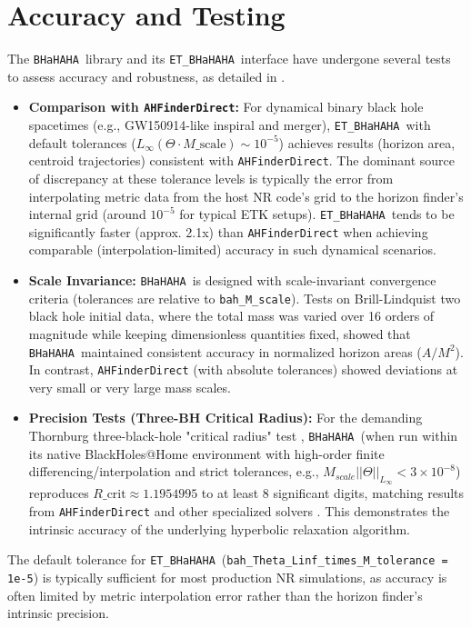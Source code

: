 \documentclass[a4paper,11pt]{article}
\newcommand{\thorn}[1]{{\tt #1}}
\newcommand{\BHaHAHA}{\thorn{ET\_BHaHAHA}} %
\newcommand{\bhahlib}{\texttt{BHaHAHA}} %
\begin{document}
\section{Accuracy and Testing}
\label{sec:accuracy}
The \bhahlib\ library and its \BHaHAHA\ interface have undergone several tests to assess accuracy and robustness, as detailed in \cite{Etienne2025etal}.
\begin{itemize}
    \item \textbf{Comparison with \thorn{AHFinderDirect}:} For dynamical binary black hole spacetimes (e.g., GW150914-like inspiral and merger), \BHaHAHA\ with default tolerances ($L_\infty(\Theta \cdot M\_{\text{scale}}) \sim 10^{-5}$) achieves results (horizon area, centroid trajectories) consistent with \thorn{AHFinderDirect}. The dominant source of discrepancy at these tolerance levels is typically the error from interpolating metric data from the host NR code's grid to the horizon finder's internal grid (around $10^{-5}$ for typical ETK setups). \BHaHAHA\ tends to be significantly faster (approx. 2.1x) than \thorn{AHFinderDirect} when achieving comparable (interpolation-limited) accuracy in such dynamical scenarios.
    \item \textbf{Scale Invariance:} \bhahlib\ is designed with scale-invariant convergence criteria (tolerances are relative to \texttt{bah\_M\_scale}). Tests on Brill-Lindquist two black hole initial data, where the total mass was varied over 16 orders of magnitude while keeping dimensionless quantities fixed, showed that \bhahlib\ maintained consistent accuracy in normalized horizon areas ($A/M^2$). In contrast, \thorn{AHFinderDirect} (with absolute tolerances) showed deviations at very small or very large mass scales.
    \item \textbf{Precision Tests (Three-BH Critical Radius):} For the demanding Thornburg three-black-hole "critical radius" test \cite{Thornburg04AHF}, \bhahlib\ (when run within its native BlackHoles@Home environment with high-order finite differencing/interpolation and strict tolerances, e.g., $M_{scale}||\Theta||_{L_\infty} < 3 \times 10^{-8}$) reproduces $R\_{\text{crit}} \approx 1.1954995$ to at least 8 significant digits, matching results from \thorn{AHFinderDirect} and other specialized solvers \cite{HuiLin2025}. This demonstrates the intrinsic accuracy of the underlying hyperbolic relaxation algorithm.
\end{itemize}
The default tolerance for \BHaHAHA\ (\texttt{bah\_Theta\_Linf\_times\_M\_tolerance = 1e-5}) is typically sufficient for most production NR simulations, as accuracy is often limited by metric interpolation error rather than the horizon finder's intrinsic precision.
\end{document}
